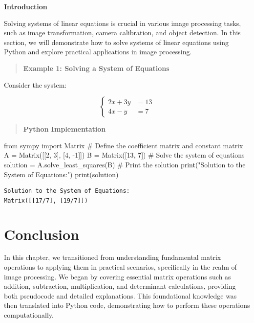 \documentclass[
  letterpaper,
  DIV=11,
  numbers=noendperiod]{scrreprt}
\newenvironment{Shaded}{\begin{snugshade}}{\end{snugshade}}
\newcommand{\BuiltInTok}[1]{\textcolor[rgb]{0.00,0.23,0.31}{#1}}
\newcommand{\CommentTok}[1]{\textcolor[rgb]{0.37,0.37,0.37}{#1}}
\newcommand{\DecValTok}[1]{\textcolor[rgb]{0.68,0.00,0.00}{#1}}
\newcommand{\ImportTok}[1]{\textcolor[rgb]{0.00,0.46,0.62}{#1}}
\newcommand{\NormalTok}[1]{\textcolor[rgb]{0.00,0.23,0.31}{#1}}
\newcommand{\OperatorTok}[1]{\textcolor[rgb]{0.37,0.37,0.37}{#1}}
\newcommand{\StringTok}[1]{\textcolor[rgb]{0.13,0.47,0.30}{#1}}
\theoremstyle{plain}
\theoremstyle{definition}
\theoremstyle{remark}
\begin{document}
\textbf{Introduction}

Solving systems of linear equations is crucial in various image
processing tasks, such as image transformation, camera calibration, and
object detection. In this section, we will demonstrate how to solve
systems of linear equations using Python and explore practical
applications in image processing.

\begin{quote}
\textbf{Example 1: Solving a System of Equations}
\end{quote}

Consider the system:

\[\begin{cases}
2x + 3y& = 13 \\
4x - y &= 7
\end{cases}\]

\begin{quote}
\textbf{Python Implementation}
\end{quote}

\begin{Shaded}
\begin{Highlighting}[]
\ImportTok{from}\NormalTok{ sympy }\ImportTok{import}\NormalTok{ Matrix}
\CommentTok{\# Define the coefficient matrix and constant matrix}
\NormalTok{A }\OperatorTok{=}\NormalTok{ Matrix([[}\DecValTok{2}\NormalTok{, }\DecValTok{3}\NormalTok{], [}\DecValTok{4}\NormalTok{, }\OperatorTok{{-}}\DecValTok{1}\NormalTok{]])}
\NormalTok{B }\OperatorTok{=}\NormalTok{ Matrix([}\DecValTok{13}\NormalTok{, }\DecValTok{7}\NormalTok{])}
\CommentTok{\# Solve the system of equations}
\NormalTok{solution }\OperatorTok{=}\NormalTok{ A.solve\_least\_squares(B)}
\CommentTok{\# Print the solution}
\BuiltInTok{print}\NormalTok{(}\StringTok{"Solution to the System of Equations:"}\NormalTok{)}
\BuiltInTok{print}\NormalTok{(solution)}
\end{Highlighting}
\end{Shaded}

\begin{verbatim}
Solution to the System of Equations:
Matrix([[17/7], [19/7]])
\end{verbatim}

\section{Conclusion}\label{conclusion}

In this chapter, we transitioned from understanding fundamental matrix
operations to applying them in practical scenarios, specifically in the
realm of image processing. We began by covering essential matrix
operations such as addition, subtraction, multiplication, and
determinant calculations, providing both pseudocode and detailed
explanations. This foundational knowledge was then translated into
Python code, demonstrating how to perform these operations
computationally.
\end{document}
